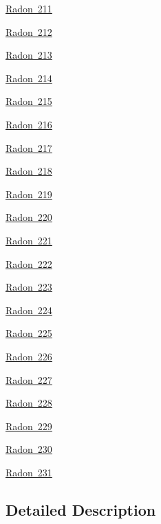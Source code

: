 \begin{DoxyCompactItemize}
\mbox{\hyperlink{group___isotope_const-_radon-_rn211}{Radon 211}}
\item 
\mbox{\hyperlink{group___isotope_const-_radon-_rn212}{Radon 212}}
\item 
\mbox{\hyperlink{group___isotope_const-_radon-_rn213}{Radon 213}}
\item 
\mbox{\hyperlink{group___isotope_const-_radon-_rn214}{Radon 214}}
\item 
\mbox{\hyperlink{group___isotope_const-_radon-_rn215}{Radon 215}}
\item 
\mbox{\hyperlink{group___isotope_const-_radon-_rn216}{Radon 216}}
\item 
\mbox{\hyperlink{group___isotope_const-_radon-_rn217}{Radon 217}}
\item 
\mbox{\hyperlink{group___isotope_const-_radon-_rn218}{Radon 218}}
\item 
\mbox{\hyperlink{group___isotope_const-_radon-_rn219}{Radon 219}}
\item 
\mbox{\hyperlink{group___isotope_const-_radon-_rn220}{Radon 220}}
\item 
\mbox{\hyperlink{group___isotope_const-_radon-_rn221}{Radon 221}}
\item 
\mbox{\hyperlink{group___isotope_const-_radon-_rn222}{Radon 222}}
\item 
\mbox{\hyperlink{group___isotope_const-_radon-_rn223}{Radon 223}}
\item 
\mbox{\hyperlink{group___isotope_const-_radon-_rn224}{Radon 224}}
\item 
\mbox{\hyperlink{group___isotope_const-_radon-_rn225}{Radon 225}}
\item 
\mbox{\hyperlink{group___isotope_const-_radon-_rn226}{Radon 226}}
\item 
\mbox{\hyperlink{group___isotope_const-_radon-_rn227}{Radon 227}}
\item 
\mbox{\hyperlink{group___isotope_const-_radon-_rn228}{Radon 228}}
\item 
\mbox{\hyperlink{group___isotope_const-_radon-_rn229}{Radon 229}}
\item 
\mbox{\hyperlink{group___isotope_const-_radon-_rn230}{Radon 230}}
\item 
\mbox{\hyperlink{group___isotope_const-_radon-_rn231}{Radon 231}}
\end{DoxyCompactItemize}


\subsection{Detailed Description}
